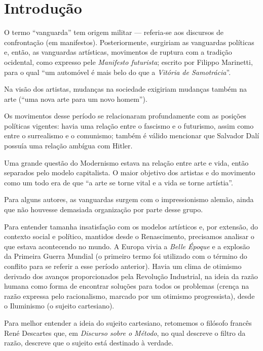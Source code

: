 
\chapter{Introdução}

O termo ``vanguarda'' tem origem militar — referia-se aos discursos de confrontação (em manifestos). Posteriormente, surgiriam as vanguardas políticas e, então, as vanguardas artísticas, movimentos de ruptura com a tradição ocidental, como expresso pele \textit{Manifesto futurista}; escrito por Filippo Marinetti, para o qual ``um automóvel é mais belo do que a \textit{Vitória de Samotrácia}''.

Na visão dos artistas, mudanças na sociedade exigiriam mudanças também na arte (``uma nova arte para um novo homem'').

Os movimentos desse período se relacionaram profundamente com as posições políticas vigentes: havia uma relação entre o fascismo e o futurismo, assim como entre o surrealismo e o comunismo; também é válido mencionar que Salvador Dalí possuía uma relação ambígua com Hitler.

Uma grande questão do Modernismo estava na relação entre arte e vida, então separados pelo modelo capitalista. O maior objetivo dos artistas e do movimento como um todo era de que ``a arte se torne vital e a vida se torne artístia''.

Para alguns autores, as vanguardas surgem com o impressionismo alemão, ainda que não houvesse demasiada organização por parte desse grupo. 

Para entender tamanha insatisfação com os modelos artísticos e, por extensão, do contexto social e político, mantidos desde o Renascimento, precisamos analisar o que estava acontecendo no mundo. A Europa vivia a \textit{Belle Époque} e a explosão da Primeira Guerra Mundial (o primeiro termo foi utilizado com o término do conflito para se referir a esse período anterior). Havia um clima de otimismo derivado dos avanços proporcionados pela Revolução Industrial, na ideia da razão humana como forma de encontrar soluções para todos os problemas (crença na razão expressa pelo racionalismo, marcado por um otimismo progressista), desde o Iluminismo (o sujeito cartesiano).

Para melhor entender a ideia do sujeito cartesiano, retomemos o filósofo francês René Descartes que, em \textit{Discurso sobre o Método}, no qual descreve o filtro da razão, descreve que o sujeito está destinado à verdade.

